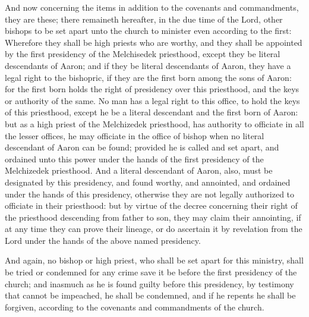 				And now concerning the items in addition to the covenants and commandments, they are these; there remaineth hereafter, in the due time of the Lord, other bishops to be set apart unto the church to minister even according to the first: Wherefore they shall be high priests who are worthy, and they shall be appointed by the first presidency of the Melchisedek priesthood, except they be literal descendants of Aaron; and if they be literal descendants of Aaron, they have a legal right to the bishopric, if they are the first born among the sons of Aaron: for the first born holds the right of presidency over this priesthood, and the keys or authority of the same. No man has a legal right to this office, to hold the keys of this priesthood, except he be a literal descendant and the first born of Aaron: but as a high priest of the Melchizedek priesthood, has authority to officiate in all the lesser offices, he may officiate in the office of bishop when no literal descendant of Aaron can be found; provided he is called and set apart, and ordained unto this power under the hands of the first presidency of the Melchizedek priesthood. And a literal descendant of Aaron, also, must be designated by this presidency, and found worthy, and annointed, and ordained under the hands of this presidency, otherwise they are not legally authorized to officiate in their priesthood: but by virtue of the decree concerning their right of the priesthood descending from father to son, they may claim their annointing, if at any time they can prove their lineage, or do ascertain it by revelation from the Lord under the hands of the above named presidency.

				And again, no bishop or high priest, who shall be set apart for this ministry, shall be tried or condemned for any crime save it be before the first presidency of the church; and inasmuch as he is found guilty before this presidency, by testimony that cannot be impeached, he shall be condemned, and if he repents he shall be forgiven, according to the covenants and commandments of the church.

